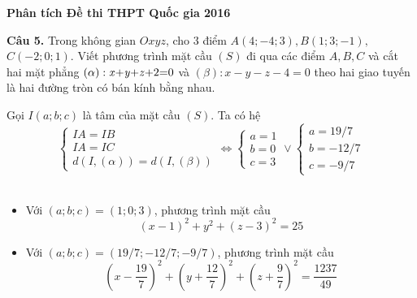 \documentclass[handout]{beamer} %
\newcommand{\cau}[2]{\begin{block}{}
		{\color{red}\textbf{Câu #1.}} #2
	\end{block}
}
\begin{document}
	\begin{frame}{\textbf{\qquad Phân tích Đề thi THPT Quốc gia 2016}}~\\[-20pt]
		\cau{5}{Trong không gian $Oxyz$, cho 3 điểm $A(4;-4;3), B(1;3;-1),$ $C(-2;0;1)$. Viết phương trình mặt cầu $(S)$ đi qua các điểm $A, B, C$ và cắt hai mặt phẳng $(\alpha): \mbox{\textit{x}+\textit{y}+\textit{z}+2=0}$ và $(\beta): x-y-z-4=0$ theo hai giao tuyến là hai đường tròn có bán kính bằng nhau.}
		Gọi $I(a;b;c)$ là tâm của mặt cầu $(S)$.
		Ta có hệ
		$$\begin{cases}
		IA=IB\\
		IA=IC\\
		d(I,(\alpha))=d(I,(\beta))
		\end{cases}\Leftrightarrow \begin{cases}
		a=1\\b=0\\c=3
		\end{cases}\vee \begin{cases}
		a=19/7\\
		b=-12/7\\
		c=-9/7
		\end{cases}$$~\\[-10pt]
		\begin{itemize}
			\item Với $(a;b;c)=(1;0;3)$, phương trình mặt cầu $$(x-1)^2+y^2+(z-3)^2=25$$
			
			
			\item  Với $(a;b;c)=(19/7;-12/7;-9/7)$, phương trình mặt cầu $$\left(x-\frac{19}{7}\right)^2+ \left(y+\frac{12}{7}\right)^2+ \left(z+\frac{9}{7}\right)^2=\frac{1237}{49}$$
		\end{itemize}
	\end{frame}
	
	
	
	
	
\end{document}
